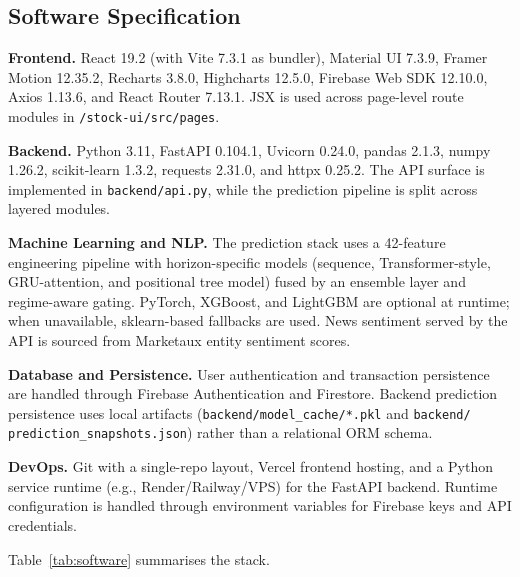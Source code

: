 \documentclass[12pt,a4paper]{report}
\numberwithin{equation}{chapter}
\begin{document}
\subsection{Software Specification}

\textbf{Frontend.} React 19.2 (with Vite 7.3.1 as bundler), Material UI 7.3.9, Framer Motion 12.35.2, Recharts 3.8.0, Highcharts 12.5.0, Firebase Web SDK 12.10.0, Axios 1.13.6, and React Router 7.13.1. JSX is used across page-level route modules in \texttt{/stock-ui/src/pages}.

\textbf{Backend.} Python 3.11, FastAPI 0.104.1, Uvicorn 0.24.0, pandas 2.1.3, numpy 1.26.2, scikit-learn 1.3.2, requests 2.31.0, and httpx 0.25.2. The API surface is implemented in \texttt{backend/api.py}, while the prediction pipeline is split across layered modules.

\textbf{Machine Learning and NLP.} The prediction stack uses a 42-feature engineering pipeline with horizon-specific models (sequence, Transformer-style, GRU-attention, and positional tree model) fused by an ensemble layer and regime-aware gating. PyTorch, XGBoost, and LightGBM are optional at runtime; when unavailable, sklearn-based fallbacks are used. News sentiment served by the API is sourced from Marketaux entity sentiment scores.

\textbf{Database and Persistence.} User authentication and transaction persistence are handled through Firebase Authentication and Firestore. Backend prediction persistence uses local artifacts (\texttt{backend/model\_cache/*.pkl} and \texttt{backend/} \texttt{prediction\_snapshots.json}) rather than a relational ORM schema.

\textbf{DevOps.} Git with a single-repo layout, Vercel frontend hosting, and a Python service runtime (e.g., Render/Railway/VPS) for the FastAPI backend. Runtime configuration is handled through environment variables for Firebase keys and API credentials.

Table~\ref{tab:software} summarises the stack.
\end{document}
